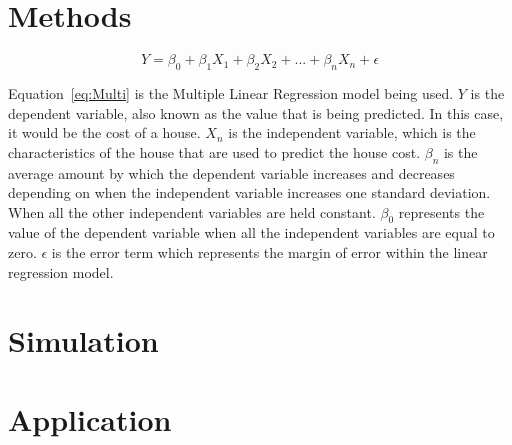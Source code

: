 \documentclass[12pt]{article}
\begin{document}
\bigskip
\bigskip


\section{Methods}
\label{sec:meth}


\begin{equation}
  \label{eq:Multi}
  Y = \beta_{0} + \beta_{1}X_{1} + \beta_{2}X_{2} + ... + \beta_{n}X_{n} + \epsilon
\end{equation}

Equation~\ref{eq:Multi} is the Multiple Linear Regression model being used. \(Y\) is the dependent variable, also known as the value that is being predicted. In this case, it would be the cost of a house. \(X_{n}\) is the independent variable, which is the characteristics of the house that are used to predict the house cost. \(\beta_{n}\) is the average amount by which the dependent variable increases and decreases depending on when the independent variable increases one standard deviation. When all the other independent variables are held constant. \(\beta_{0}\) represents the value of the dependent variable when all the independent variables are equal to zero. \(\epsilon\) is the error term which represents the margin of error within the linear regression model. 

\section{Simulation}
\label{sec:sim}


\section{Application}
\label{sec:app}

\end{document}
